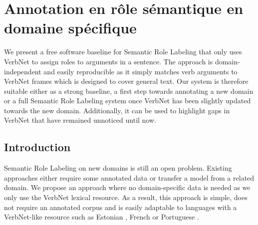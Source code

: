 

\chapter{Annotation en rôle sémantique en domaine spécifique}
\label{ch:domainsrl}


We present a free software baseline for Semantic Role Labeling that only uses
VerbNet to assign roles to arguments in a sentence. The approach is
domain-independent and easily reproducible as it simply matches verb arguments
to VerbNet frames which is designed to cover general text.  Our system is
therefore suitable either as a strong baseline, a first step towards annotating
a new domain or a full Semantic Role Labeling system once VerbNet has been
slightly updated towards the new domain. Additionally, it can be used to
highlight gaps in VerbNet that have remained unnoticed until now.

\section{Introduction}

Semantic Role Labeling on new domains is still an open problem.  Existing
approaches either require some annotated data or transfer a model from a
related domain. We propose an approach where no domain-specific data is needed
as we only use the VerbNet lexical resource. As a result, this approach is
simple, does not require an annotated corpus and is easily adaptable to
languages with a VerbNet-like resource such as Estonian
\citep{jentson2014verbnet}, French \citep{pradet2014adapting} or Portuguese
\citep{scarton2012towards}.

